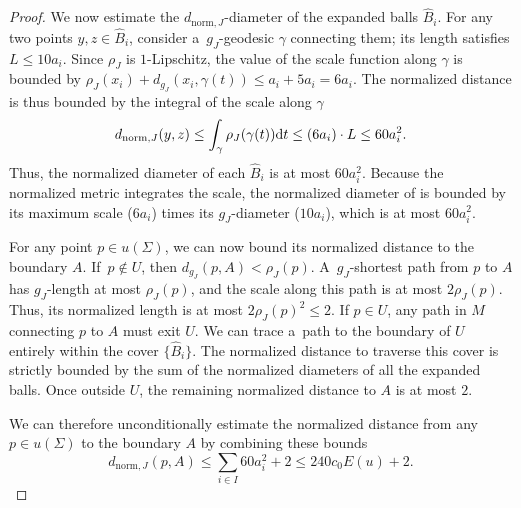 \documentclass[10pt,a4paper]{amsart}
\numberwithin{equation}{section}
\theoremstyle{definition}
\begin{document}
\begin{proof}
 We now estimate the $d_{\mathrm{norm},J}$-diameter of the expanded balls $\widehat{B}_i$. For any two points $y, z \in \widehat{B}_i$, consider a~$g_J$-geodesic $\gamma$ connecting them; its length satisfies $L \le 10a_i$. Since $\rho_J$ is $1$-Lipschitz, the value of the scale function along $\gamma$ is bounded by $\rho_J(x_i) + d_{g_J}(x_i, \gamma(t)) \le a_i + 5a_i = 6a_i$. The normalized distance is thus bounded by the integral of the scale along $\gamma$
 \[
 d_{\mathrm{norm},J}(y, z) \le \int_\gamma \rho_J(\gamma(t)) {\rm d}t \le (6a_i) \cdot L \le 60 a_i^2.
 \]
 Thus, the normalized diameter of each $\widehat{B}_i$ is at most $60a_i^2$.
 Because the normalized metric integrates the scale, the normalized diameter of  is bounded by its maximum scale ($6a_i$) times its $g_J$-diameter ($10a_i$), which is at most $60a_i^2$.

 For any point $p \in u(\Sigma)$, we can now bound its normalized distance to the boundary $A$.
 If~${p \notin U}$, then $d_{g_J}(p, A) < \rho_J(p)$. A~$g_J$-shortest path from $p$ to $A$ has $g_J$-length at most $\rho_J(p)$, and the scale along this path is at most $2\rho_J(p)$. Thus, its normalized length is at most $2\rho_J(p)^2 \le 2$.
 If $p \in U$, any path in $M$ connecting $p$ to $A$ must exit $U$. We can trace a~path to the boundary of $U$ entirely within the cover $\big\{\widehat{B}_i\big\}$. The normalized distance to traverse this cover is strictly bounded by the sum of the normalized diameters of all the expanded balls. Once outside $U$, the remaining normalized distance to $A$ is at most $2$.

 We can therefore unconditionally estimate the normalized distance from any $p \in u(\Sigma)$ to the boundary $A$ by combining these bounds
 \[%
 d_{\mathrm{norm},J}(p,A) \le \sum_{i \in I} 60a_i^2 + 2 \le 240 c_0 E(u) + 2.\tag*{\qed}
 \] \renewcommand{\qed}{}
\end{proof}
\end{document}
